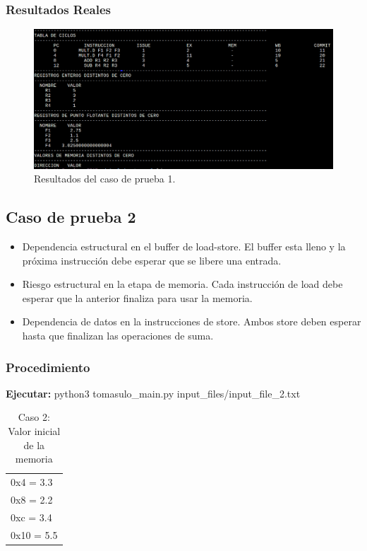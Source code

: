 \documentclass[a4paper]{article}
\begin{document}
	\subsubsection*{Resultados Reales}

	\begin{figure}[H]
	\centering
	\includegraphics[width=1\textwidth]{figures/test1.png}
	\caption{\label{fig:bloques}Resultados del caso de prueba 1.}
	\end{figure}


	\subsection*{Caso de prueba 2}

	\begin{itemize}
		\item Dependencia estructural en el buffer de load-store. El buffer esta lleno y la próxima instrucción debe esperar que se libere una entrada. 
		\item Riesgo estructural en la etapa de memoria. Cada instrucción de load debe esperar que la anterior finaliza para usar la memoria.
		\item Dependencia de datos en la instrucciones de store. Ambos store deben esperar hasta que finalizan las operaciones de suma.
	\end{itemize}

	\subsubsection*{Procedimiento}

	\textbf{Ejecutar:} python3 tomasulo\_main.py input\_files/input\_file\_2.txt

	\begin{table}[H]
		\centering
		\caption*{Caso 2: Valor inicial de la memoria}
		\begin{tabular}{l}
			0x4 = 3.3 \\
			0x8 = 2.2 \\
			0xc = 3.4 \\
			0x10 = 5.5			
		\end{tabular}
	\end{table}
\end{document}
